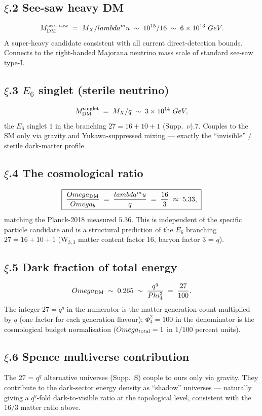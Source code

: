 \documentclass[12pt,a4paper]{article}
\def\mathbf#1{#1}%
\def\text#1{#1}%
\def\lambda{lambda}%
\def\mu{mu}%
\def\Phi#1{Phi#1}%
\def\Omega{Omega}%
\theoremstyle{definition}
\begin{document}
\subsection*{$\xi$.2 \quad See-saw heavy DM}
\[
M_{\rm DM}^{\rm see-saw} \;=\; M_X/\lambda^\mu \;\sim\; 10^{15}/16 \;\sim\; 6\times 10^{13}\ \text{GeV}.
\]
A super-heavy candidate consistent with all current direct-detection
bounds. Connects to the right-handed Majorana neutrino mass scale
of standard see-saw type-I.

\subsection*{$\xi$.3 \quad $E_6$ singlet (sterile neutrino)}
\[
M_{\rm DM}^{\rm singlet} \;=\; M_X/q \;\sim\; 3\times 10^{14}\ \text{GeV},
\]
the $E_6$ singlet $\mathbf{1}$ in the branching $\mathbf{27} =
\mathbf{16}+\mathbf{10}+\mathbf{1}$ (Supp.~$\nu$).7. Couples to the
SM only via gravity and Yukawa-suppressed mixing — exactly the
``invisible'' / sterile dark-matter profile.

\subsection*{$\xi$.4 \quad The cosmological ratio}
\[
\boxed{\;\frac{\Omega_{\rm DM}}{\Omega_b} \;=\; \frac{\lambda^\mu}{q} \;=\; \frac{16}{3} \;\approx\; 5.33,\;}
\]
matching the Planck-2018 measured $5.36$. This is independent of the
specific particle candidate and is a structural prediction of the
$E_6$ branching $\mathbf{27} = \mathbf{16}+\mathbf{10}+\mathbf{1}$
(W$_{3,3}$ matter content factor 16, baryon factor 3 = $q$).

\subsection*{$\xi$.5 \quad Dark fraction of total energy}
\[
\Omega_{\rm DM} \;\sim\; 0.265 \;\sim\; \frac{q^q}{\Phi_4^2} \;=\; \frac{27}{100}.
\]
The integer $27 = q^q$ in the numerator is the matter generation count
multiplied by $q$ (one factor for each generation flavour); $\Phi_4^2
= 100$ in the denominator is the cosmological budget normalisation
($\Omega_{\rm total} = 1$ in $1/100$ percent units).

\subsection*{$\xi$.6 \quad Spence multiverse contribution}
The 27 = $q^q$ alternative universes (Supp.~S) couple to ours only
via gravity. They contribute to the dark-sector energy density as
``shadow'' universes — naturally giving a $q^q$-fold dark-to-visible
ratio at the topological level, consistent with the $16/3$ matter ratio
above.
\end{document}
